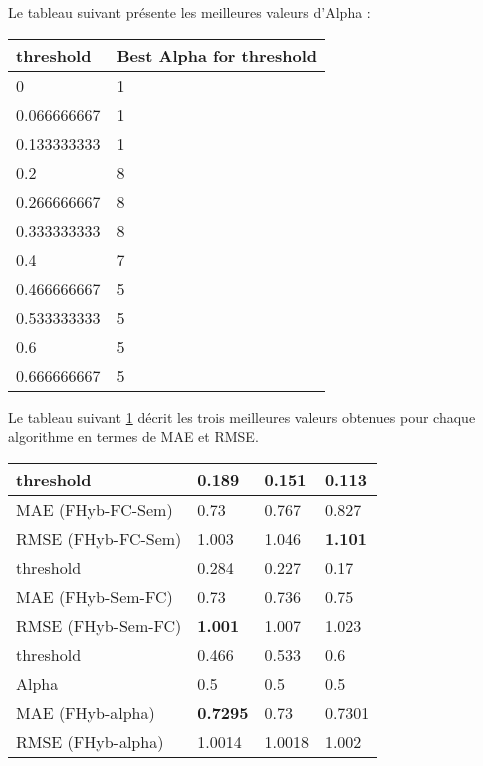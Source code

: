 Le tableau suivant présente les meilleures valeurs d'Alpha :
\begin{table}[H]
	\centering
	\begin{tabular}{|l|l|}
		\hline
		threshold & Best Alpha for threshold \\ \hline
		0 & 1 \\ \hline
		0.066666667 & 1 \\ \hline
		0.133333333 & 1 \\ \hline
		0.2 & 8 \\ \hline
		0.266666667 & 8 \\ \hline
		0.333333333 & 8 \\ \hline
		0.4 & 7 \\ \hline
		0.466666667 & 5 \\ \hline
		0.533333333 & 5 \\ \hline
		0.6 & 5 \\ \hline
		0.666666667 & 5 \\ \hline
	\end{tabular}
\end{table}

Le tableau suivant \ref{tab:hyb} décrit les trois meilleures valeurs obtenues pour chaque algorithme en termes de MAE et RMSE.
\begin{table}[H]
	\centering
	\begin{tabular}{|l|l|l|l|}
		\hline
		threshold & 0.189 & 0.151 & 0.113 \\ \hline
		MAE  (FHyb-FC-Sem) & 0.73 & 0.767 & 0.827 \\ \hline
		RMSE (FHyb-FC-Sem) & 1.003 & 1.046 & \textbf{1.101} \\ \hline\hline
		threshold & 0.284& 0.227 & 0.17 \\ \hline
		MAE  (FHyb-Sem-FC) & 0.73 & 0.736 & 0.75 \\ \hline
		RMSE (FHyb-Sem-FC) & \textbf{1.001} & 1.007 & 1.023 \\ \hline\hline
		threshold & 0.466 & 0.533 & 0.6 \\ \hline
		Alpha & 0.5 & 0.5 & 0.5 \\ \hline
		MAE  (FHyb-alpha) & \textbf{0.7295} & 0.73 & 0.7301 \\ \hline
		RMSE (FHyb-alpha) & 1.0014 & 1.0018 & 1.002 \\ \hline
	\end{tabular}
	\label{tab:hyb}
\end{table}


